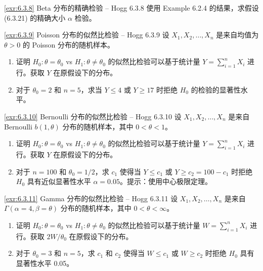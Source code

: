 \begin{exercise}{\ref{exr:6.3.8} Beta 分布的精确检验 – Hogg 6.3.8}\label{exr:6.3.8}
使用 Example 6.2.4 的结果，求假设 (6.3.21) 的精确大小 $\alpha$ 检验。
\end{exercise}

\begin{exercise}{\ref{exr:6.3.9} Poisson 分布的似然比检验 – Hogg 6.3.9}\label{exr:6.3.9}
设 $X_1, X_2, \ldots, X_n$ 是来自均值为 $\theta > 0$ 的 Poisson 分布的随机样本。

\begin{enumerate}
\item[(a)] 证明 $H_0: \theta=\theta_0$ vs $H_1: \theta \neq \theta_0$ 的似然比检验可以基于统计量 $Y = \sum_{i=1}^n X_i$ 进行。获取 $Y$ 在原假设下的分布。
\item[(b)] 对于 $\theta_0=2$ 和 $n=5$，求当 $Y \leq 4$ 或 $Y \geq 17$ 时拒绝 $H_0$ 的检验的显著性水平。
\end{enumerate}
\end{exercise}

\begin{exercise}{\ref{exr:6.3.10} Bernoulli 分布的似然比检验 – Hogg 6.3.10}\label{exr:6.3.10}
设 $X_1, X_2, \ldots, X_n$ 是来自 Bernoulli $b(1,\theta)$ 分布的随机样本，其中 $0 < \theta < 1$。

\begin{enumerate}
\item[(a)] 证明 $H_0: \theta=\theta_0$ vs $H_1: \theta \neq \theta_0$ 的似然比检验可以基于统计量 $Y = \sum_{i=1}^n X_i$ 进行。获取 $Y$ 在原假设下的分布。
\item[(b)] 对于 $n=100$ 和 $\theta_0=1/2$，求 $c_1$ 使得当 $Y \leq c_1$ 或 $Y \geq c_2 = 100-c_1$ 时拒绝 $H_0$ 具有近似显著性水平 $\alpha=0.05$。提示：使用中心极限定理。
\end{enumerate}
\end{exercise}

\begin{exercise}{\ref{exr:6.3.11} Gamma 分布的似然比检验 – Hogg 6.3.11}\label{exr:6.3.11}
设 $X_1, X_2, \ldots, X_n$ 是来自 $\Gamma(\alpha=4, \beta=\theta)$ 分布的随机样本，其中 $0 < \theta < \infty$。

\begin{enumerate}
\item[(a)] 证明 $H_0: \theta=\theta_0$ vs $H_1: \theta \neq \theta_0$ 的似然比检验可以基于统计量 $W = \sum_{i=1}^n X_i$ 进行。获取 $2W/\theta_0$ 在原假设下的分布。
\item[(b)] 对于 $\theta_0=3$ 和 $n=5$，求 $c_1$ 和 $c_2$ 使得当 $W \leq c_1$ 或 $W \geq c_2$ 时拒绝 $H_0$ 具有显著性水平 0.05。
\end{enumerate}
\end{exercise}

